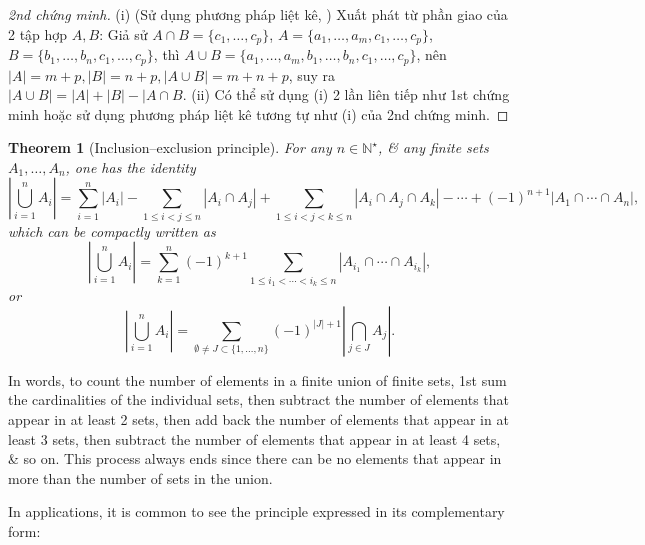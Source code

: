 \documentclass[oneside]{book}
\newtheorem{theorem}{Theorem}
\begin{document}
\begin{proof}[2nd chứng minh]
	(i) (Sử dụng phương pháp liệt kê, \cite[VD2, p. 16]{Phuong_to_hop}) Xuất phát từ phần giao của 2 tập hợp $A,B$: Giả sử $A\cap B = \{c_1,\ldots,c_p\}$, $A = \{a_1,\ldots,a_m,c_1,\ldots,c_p\}$, $B = \{b_1,\ldots,b_n,c_1,\ldots,c_p\}$, thì $A\cup B = \{a_1,\ldots,a_m,b_1,\ldots,b_n,c_1,\ldots,c_p\}$, nên $|A| = m + p,|B| = n + p,|A\cup B| = m + n + p$, suy ra $|A\cup B| = |A| + |B| - |A\cap B$. (ii)  Có thể sử dụng (i) 2 lần liên tiếp như 1st chứng minh hoặc sử dụng phương pháp liệt kê tương tự như (i) của 2nd chứng minh.
\end{proof}

\begin{theorem}[Inclusion--exclusion principle]
	\label{thm: inclusion-exclusion: combinatorial version}
	For any $n\in\mathbb{N}^\star$, \& any finite sets $A_1,\ldots,A_n$, one has the identity
	\begin{equation*}
		\left|\bigcup_{i=1}^n A_i\right| = \sum_{i=1}^n |A_i| - \sum_{1\le i < j\le n} |A_i\cap A_j| + \sum_{1\le i < j < k\le n} |A_i\cap A_j\cap A_k| - \cdots + (-1)^{n+1}|A_1\cap\cdots\cap A_n|,
	\end{equation*}
	which can be compactly written as
	\begin{equation*}
		\left|\bigcup_{i=1}^n A_i\right| = \sum_{k=1}^n (-1)^{k+1}\sum_{1\le i_1 < \cdots < i_k\le n} |A_{i_1}\cap\cdots\cap A_{i_k}|,
	\end{equation*}
	or
	\begin{equation*}
		\left|\bigcup_{i=1}^n A_i\right| = \sum_{\emptyset\ne J\subset\{1,\ldots,n\}} (-1)^{|J|+1} \left|\bigcap_{j\in J} A_j\right|.
	\end{equation*}
\end{theorem}
In words, to count the number of elements in a finite union of finite sets, 1st sum the cardinalities of the individual sets, then subtract the number of elements that appear in at least 2 sets, then add back the number of elements that appear in at least 3 sets, then subtract the number of elements that appear in at least 4 sets, \& so on. This process always ends since there can be no elements that appear in more than the number of sets in the union.

In applications, it is common to see the principle expressed in its complementary form:
\end{document}
